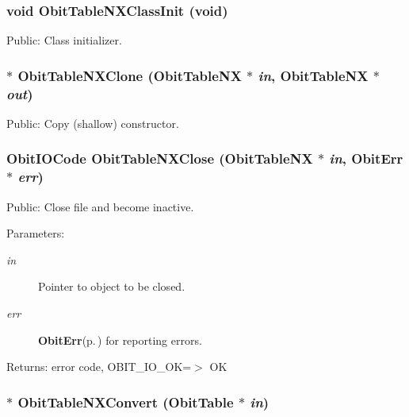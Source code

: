 \subsubsection{\setlength{\rightskip}{0pt plus 5cm}void Obit\-Table\-NXClass\-Init (void)}\label{ObitTableNX_8h_a10}


Public: Class initializer. 

\subsubsection{$\ast$ Obit\-Table\-NXClone ({\bf Obit\-Table\-NX} $\ast$ {\em in}, {\bf Obit\-Table\-NX} $\ast$ {\em out})}\label{ObitTableNX_8h_a15}


Public: Copy (shallow) constructor. 

\subsubsection{\setlength{\rightskip}{0pt plus 5cm}Obit\-IOCode Obit\-Table\-NXClose ({\bf Obit\-Table\-NX} $\ast$ {\em in}, {\bf Obit\-Err} $\ast$ {\em err})}\label{ObitTableNX_8h_a21}


Public: Close file and become inactive. 

\begin{Desc}
\item[Parameters:]
\begin{description}
\item[{\em in}]Pointer to object to be closed. \item[{\em err}]{\bf Obit\-Err}{\rm (p.\,\pageref{structObitErr})} for reporting errors. \end{description}
\end{Desc}
\begin{Desc}
\item[Returns:]error code, OBIT\_\-IO\_\-OK=$>$ OK \end{Desc}
\subsubsection{$\ast$ Obit\-Table\-NXConvert ({\bf Obit\-Table} $\ast$ {\em in})}\label{ObitTableNX_8h_a16}


